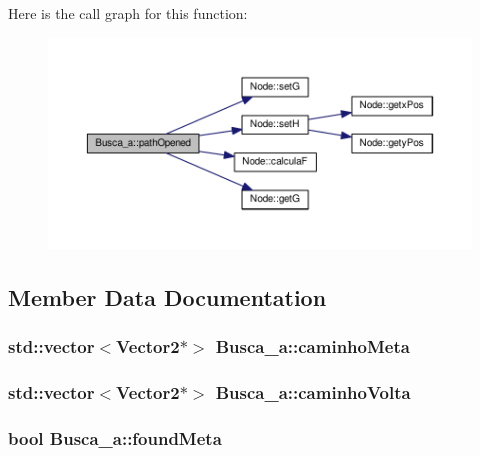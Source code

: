 Here is the call graph for this function\+:
\nopagebreak
\begin{figure}[H]
\begin{center}
\leavevmode
\includegraphics[width=350pt]{classBusca__a_a762c5b4a508658689ad8c7b218c6238c_cgraph}
\end{center}
\end{figure}




\subsection{Member Data Documentation}
\subsubsection[{\texorpdfstring{caminho\+Meta}{caminhoMeta}}]{\setlength{\rightskip}{0pt plus 5cm}std\+::vector$<${\bf Vector2}$\ast$$>$ Busca\+\_\+a\+::caminho\+Meta}\hypertarget{classBusca__a_ad14fbc1b7c5e830161c6889b7c4c6d3f}{}\label{classBusca__a_ad14fbc1b7c5e830161c6889b7c4c6d3f}
\subsubsection[{\texorpdfstring{caminho\+Volta}{caminhoVolta}}]{\setlength{\rightskip}{0pt plus 5cm}std\+::vector$<${\bf Vector2}$\ast$$>$ Busca\+\_\+a\+::caminho\+Volta}\hypertarget{classBusca__a_a8d0d37ee53d3d9cf4d69a4f6e24f6c8e}{}\label{classBusca__a_a8d0d37ee53d3d9cf4d69a4f6e24f6c8e}
\subsubsection[{\texorpdfstring{found\+Meta}{foundMeta}}]{\setlength{\rightskip}{0pt plus 5cm}bool Busca\+\_\+a\+::found\+Meta}\hypertarget{classBusca__a_a52388dc808f1ea2343e739a3e0025dfd}{}\label{classBusca__a_a52388dc808f1ea2343e739a3e0025dfd}
